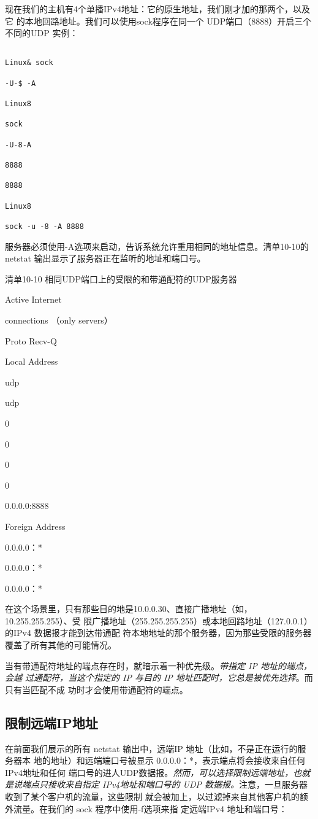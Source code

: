 现在我们的主机有4个单播IPv4地址：它的原生地址，我们刚才加的那两个，以及它
的本地回路地址。我们可以使用sock程序在同一个 UDP端口（8888）开启三个不同的UDP
实例：

\begin{verbatim}
    
Linux& sock

-U-$ -A

Linux8

sock

-U-8-A

8888

8888

Linux8

sock -u -8 -A 8888
\end{verbatim}

服务器必须使用-A选项来启动，告诉系统允许重用相同的地址信息。清单10-10的
netstat 输出显示了服务器正在监听的地址和端口号。

清单10-10 相同UDP端口上的受限的和带通配符的UDP服务器

Active Internet

connections （only servers）

Proto Recv-Q

Local Address

udp

udp

0

0

0

0

0.0.0.0:8888

Foreign Address

0.0.0.0：*

0.0.0.0：*

0.0.0.0：*

在这个场景里，只有那些目的地是10.0.0.30、直接广播地址（如，10.255.255.255）、受
限广播地址（255.255.255.255）或本地回路地址（127.0.0.1）的IPv4 数据报才能到达带通配
符本地地址的那个服务器，因为那些受限的服务器覆盖了所有其他的可能情况。

当有带通配符地址的端点存在时，就暗示着一种优先级。\emph{带指定 IP 地址的端点，会越
过通配符，当这个指定的 IP 与目的 IP 地址匹配时，它总是被优先选择}。而只有当匹配不成
功时才会使用带通配符的端点。

\subsection{限制远端IP地址}
在前面我们展示的所有 netstat 输出中，远端IP 地址（比如，不是正在运行的服务器本
地的地址）和远端端口号被显示 0.0.0.0：*，表示端点将会接收来自任何IPv4地址和任何
端口号的进人UDP数据报。\emph{然而，可以选择限制远端地址，也就是说端点只接收来自指定
IPv4地址和端口号的 UDP 数据报。}注意，一旦服务器收到了某个客户机的流量，这些限制
就会被加上，以过滤掉来自其他客户机的额外流量。在我们的 sock 程序中使用-f选项来指
定远端IPv4 地址和端口号：

